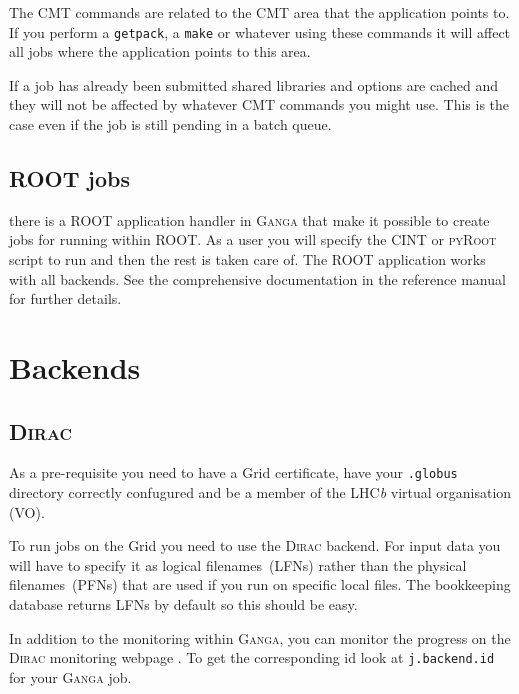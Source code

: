\documentclass{howto}
\def\ganga {\textsc{Ganga}\xspace}
\def\root {\textsc{ROOT}\xspace}
\def\lhcb {LHC{\em b\/}\xspace}
\def\dirac {\textsc{Dirac}\xspace}
\begin{document}
The CMT commands are related to the CMT area that the application points to.
If you perform a \texttt{getpack}, a \texttt{make} or whatever using these
commands it will affect all jobs where the application points to this area.

\begin{notice}
  If a job has already been submitted shared libraries and options are cached
  and they will not be affected by whatever CMT commands you might use. This
  is the case even if the job is still pending in a batch queue.
\end{notice}

\subsection{\root jobs}
\label{sec:ROOT}
there is a \root application handler in \ganga that make it possible to create
jobs for running within \root. As a user you will specify the \textsc{CINT} or
\textsc{pyRoot} script to run and then the rest is taken care of. The \root
application works with all backends. See the comprehensive documentation in
the reference manual for further details.

\section{Backends}
\label{sec:backends}

\subsection{\dirac}
\label{sec:dirac}
\begin{notice}
  As a pre-requisite you need to have a Grid certificate, have your
  \texttt{.globus} directory correctly confugured and be a member of the
  \lhcb virtual organisation (VO).
\end{notice}
To run jobs on the Grid you need to use the \dirac backend. For input data you
will have to specify it as logical filenames~(LFNs) rather than the physical
filenames~(PFNs) that are used if you run on specific local files. The bookkeeping database
returns LFNs by default so this should be easy.
\begin{seealso}
  In addition to the monitoring within \ganga, you can monitor the progress on
  the \dirac monitoring webpage 
  . To get the
  corresponding id look at \texttt{j.backend.id} for your \ganga job.
\end{seealso}
\end{document}
